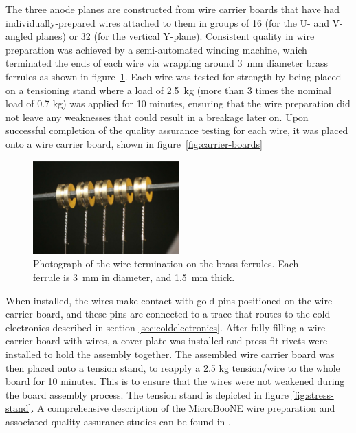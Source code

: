 The three anode planes are constructed from wire carrier boards that have had individually-prepared wires attached to them in groups of 16 (for the U- and V- angled planes) or 32 (for the vertical Y-plane).  Consistent quality in wire preparation was achieved by a semi-automated winding machine, which terminated the ends of each wire via wrapping around 3~mm diameter brass ferrules as shown in figure~\ref{fig:ferrules}. Each wire was tested for strength by being placed on a tensioning stand where a load of 2.5~kg (more than 3 times the nominal load of 0.7 kg) was applied for 10 minutes, ensuring that the wire preparation did not leave any weaknesses that could result in a breakage later on.  Upon successful completion of the quality assurance testing for each wire, it was placed onto a wire carrier board, shown in figure~\ref{fig:carrier-boards}

\begin{figure}[htb]
\centering
\includegraphics[width=0.5\textwidth]{figures/wire-twist.pdf}
\caption{Photograph of the wire termination on the brass ferrules.  Each ferrule is 3~mm in diameter, and 1.5~mm thick.}
\label{fig:ferrules}
\end{figure}


When installed, the wires make contact with gold pins positioned on the wire carrier board, and these pins are connected to a trace that routes to the cold electronics described in section \ref{sec:coldelectronics}.  After fully filling a wire carrier board with wires, a cover plate was installed and press-fit rivets were installed to hold the assembly together. The assembled wire carrier board was then placed onto a tension stand, to reapply a 2.5 kg tension/wire to the whole board for 10 minutes. This is to ensure that the wires were not weakened during the board assembly process. The tension stand is depicted in figure \ref{fig:stress-stand}.   A comprehensive description of the MicroBooNE wire preparation and associated quality assurance studies can be found in \cite{Acciarri:2016ugk}.%

